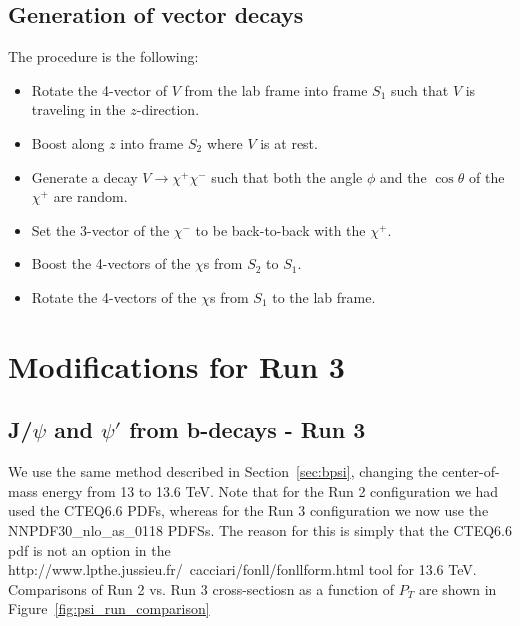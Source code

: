 \documentclass[12pt]{article}
\begin{document}
\subsection{Generation of vector decays}

The procedure is the following:

\begin{itemize}
  \item Rotate the 4-vector of $V$ from the lab frame into frame
    $S_1$ such that $V$ is traveling in the $z$-direction.
  \item  Boost along $z$ into frame $S_2$ where $V$ is at rest.
  \item Generate a decay $V \to \chi^+ \chi^-$ such that
    both the angle $\phi$ and the $\cos \theta$ of the $\chi^+$ are random.
  \item   Set the 3-vector of the $\chi^-$ to be back-to-back with the $\chi^+$.
  \item Boost the 4-vectors of the $\chi$s from $S_2$ to $S_1$.
\item Rotate the 4-vectors of the $\chi$s from $S_1$ to the lab frame.
\end{itemize}

\clearpage

\appendix



\section{Modifications for Run 3}

\subsection{J/$\psi$ and $\psi'$ from b-decays - Run 3}
\label{sec:bpsi3}
We use the same method described in Section~\ref{sec:bpsi}, changing the center-of-mass energy
from 13 to 13.6 TeV.  Note that for the Run 2 configuration we had used the CTEQ6.6 PDFs,
whereas for the Run 3 configuration we now use the NNPDF30\_nlo\_as\_0118 PDFSs.  The reason
for this is simply that the CTEQ6.6 pdf is not an option in the \\
http://www.lpthe.jussieu.fr/~cacciari/fonll/fonllform.html
     tool for 13.6 TeV.  Comparisons of Run 2 vs. Run 3 cross-sectiosn as a function
     of $P_T$ are shown in Figure~\ref{fig:psi_run_comparison} 
\end{document}
